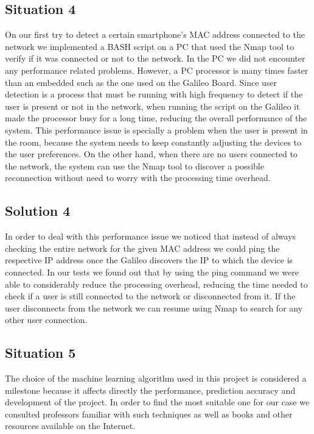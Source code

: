 \documentclass[12pt]{partialreport}
\begin{document}
\subsection*{Situation 4}
On our first try to detect a certain smartphone's MAC address connected to the network we implemented a BASH script on a PC that used the Nmap tool to verify if it was connected or not to the network. In the PC we did not encounter any performance related problems. However, a PC processor is many times faster than an embedded such as the one used on the Galileo Board. Since user detection is a process that must be running with high frequency to detect if the user is present or not in the network, when running the script on the Galileo it made the processor busy for a long time, reducing the overall performance of the system. This performance issue is specially a problem when the user is present in the room, because the system needs to keep constantly adjusting the devices to the user preferences. On the other hand, when there are no users connected to the network, the system can use the Nmap tool to discover a possible reconnection without need to worry with the processing time overhead.

\subsection*{Solution 4}
In order to deal with this performance issue we noticed that instead of always checking the entire network for the given MAC address we could ping the respective IP address once the Galileo discovers the IP to which the device is connected. In our tests we found out that by using the ping command we were able to considerably reduce the processing overhead, reducing the time needed to check if a user is still connected to the network or disconnected from it. If the user disconnects from the network we can resume using Nmap to search for any other user connection.


\subsection*{Situation 5}
The choice of the machine learning algorithm used in this project is considered a milestone because it affects directly the performance, prediction accuracy and development of the project. In order to find the most suitable one for our case we consulted professors familiar with such techniques as well as books and other resources available on the Internet.
\end{document}
